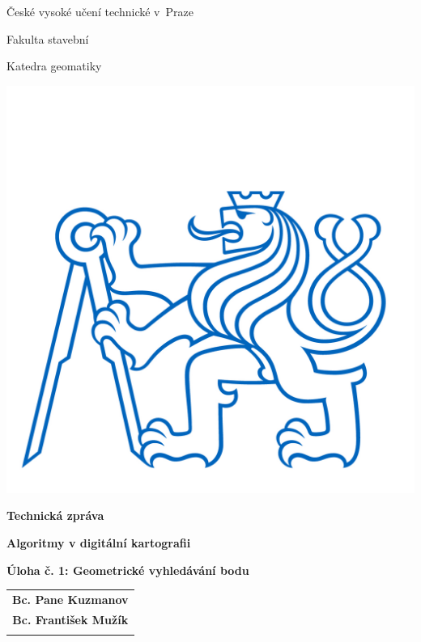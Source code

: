 \documentclass[a4paper, 12pt, oneside, titlepage]{article} %
\begin{document}
\setcounter{page}{1}   %
\thispagestyle{empty}

\begin{center}

\large

\v{C}eské vysoké učení technické v~Praze

\medskip

Fakulta stavební
\medskip

Katedra geomatiky

\vfill
\centerline{\mbox{\includegraphics[scale=1.3]{obrazky/symbol_cvut_konturova_verze.jpg}} }


{\bf\Large Technická zpráva}

\vfill

{\bf\LARGE\bfseries Algoritmy v digitální kartografii}

\vfill

{\bf\Large Úloha č. 1: Geometrické vyhledávání bodu}


\vfill



\vfill
\vspace{5mm}

\begin{tabular}{c}

{\bf Bc. Pane Kuzmanov}\\
\noalign{\vspace{2mm}}
{\bf Bc. František Mužík}\\
\noalign{\vspace{10mm}}


\end{tabular}
\end{center}
\end{document}
